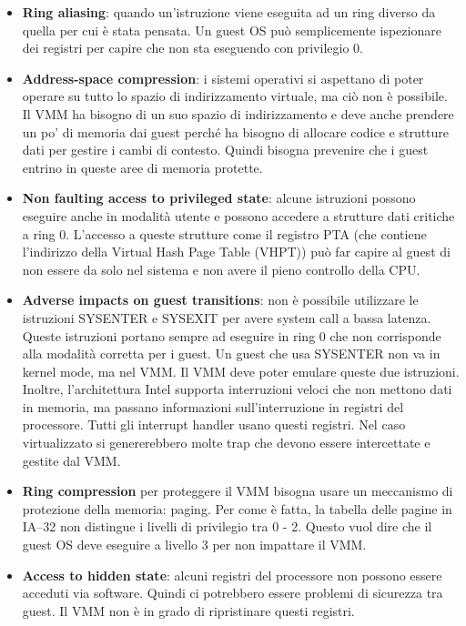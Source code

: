 \documentclass[11pt,a4paper]{report}
\begin{document}
\begin{itemize}
    \item \textbf{Ring aliasing}: quando un'istruzione viene eseguita ad un ring diverso da quella per cui è stata pensata. Un guest OS può semplicemente ispezionare dei registri per capire che non sta eseguendo con privilegio 0.
    \item \textbf{Address-space compression}: i sistemi operativi si aspettano di poter operare su tutto lo spazio di indirizzamento virtuale, ma ciò non è possibile. Il VMM ha bisogno di un suo spazio di indirizzamento e deve anche prendere un po' di memoria dai guest perché ha bisogno di allocare codice e strutture dati per gestire i cambi di contesto. Quindi bisogna prevenire che i guest entrino in queste aree di memoria protette.
    \item \textbf{Non faulting access to privileged state}: alcune istruzioni possono eseguire anche in modalità utente e possono accedere a strutture dati critiche a ring 0. L'accesso a queste strutture come il registro PTA (che contiene l'indirizzo della Virtual Hash Page Table (VHPT)) può far capire al guest di non essere da solo nel sistema e non avere il pieno controllo della CPU.
    \item \textbf{Adverse impacts on guest transitions}: non è possibile utilizzare le istruzioni SYSENTER e SYSEXIT per avere system call a bassa latenza. Queste istruzioni portano sempre ad eseguire in ring 0 che non corrisponde alla modalità corretta per i guest. Un guest che usa SYSENTER non va in kernel mode, ma nel VMM. Il VMM deve poter emulare queste due istruzioni. Inoltre, l'architettura Intel supporta interruzioni veloci che non mettono dati in memoria, ma passano informazioni sull'interruzione in registri del processore. Tutti gli interrupt handler usano questi registri. Nel caso virtualizzato si genererebbero molte trap che devono essere intercettate e gestite dal VMM.
    \item \textbf{Ring compression} per proteggere il VMM bisogna usare un meccanismo di protezione della memoria: paging. Per come è fatta, la tabella delle pagine in IA--32 non distingue i livelli di privilegio tra 0 - 2. Questo vuol dire che il guest OS deve eseguire a livello 3 per non impattare il VMM.
    \item \textbf{Access to hidden state}: alcuni registri del processore non possono essere acceduti via software. Quindi ci potrebbero essere problemi di sicurezza tra guest. Il VMM non è in grado di ripristinare questi registri.
\end{itemize}
\end{document}
